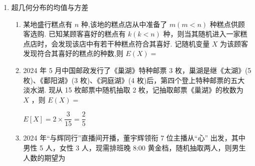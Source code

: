\begin{enumerate}
\begin{enumerate}
\begin{jieda}
            $P\left( {\xi  \leq  1}\right)  = P\left( {\xi  = 0}\right)  + P\left( {\xi  = 1}\right)  = \dfrac{{{C}}_{7}^{5}{{C}}_{5}^{6} + {{C}}_{5}^{7}{{C}}_{7}^{4}}{{{C}}_{12}^{5}}$ ,
            
            $P\left( {\xi  \geq  1}\right)  = P\left( {\xi  = 2}\right)  + P\left( {\xi  = 1}\right)  = \dfrac{{{C}}_{7}^{3}{{C}}_{5}^{2} + {{C}}_{5}^{7}{{C}}_{7}^{4}}{{{C}}_{12}^{5}},P\left( {\xi  \leq  2}\right)  = 1$
        \end{jieda}
        \item 一个班级共有 30 名学生，其中有 10 名女生， 现从中任选三人代表班级参加学校开展的某项活动,假设选出的 3 名代表中的女生人数为变量 $X$ ,男生的人数为变量 $Y$ ，则 $P\left( {X = 2}\right)  + P\left( {Y = 2}\right)$ 等于
        \begin{jieda}
            因为 $P\left( {X = 2}\right)  = \dfrac{{{C}}_{10}^{2}{{C}}_{20}^{1}}{{{C}}_{30}^{3}},P\left( {Y = 2}\right)  = \dfrac{{{C}}_{10}^{1}{{C}}_{20}^{2}}{{{C}}_{30}^{3}}$，所以 $P\left( {X = 2}\right)  + P\left( {Y = 2}\right)  = \dfrac{{{C}}_{10}^{2}{{C}}_{20}^{1} + {{C}}_{10}^{1}{{C}}_{20}^{2}}{{{C}}_{30}^{3}}$ .
        \end{jieda}
    \end{enumerate}
    \item 超几何分布的均值与方差
    \begin{enumerate}
        \item 某地盛行糕点有 $n$ 种,该地的糕点店从中准备了 $m\left( {m < n}\right)$ 种糕点供顾客选购. 已知某顾客喜好的糕点有 $k\left( {k < n}\right)$ 种，则当其随机进入一家糕点店时，会发现该店中有若干种糕点符合其喜好. 记随机变量 $X$ 为该顾客发现符合其喜好的糕点的种数,则 $E\left( X\right)  =$
        \item 2024 年 5 月中国邮政发行了《巢湖》特种邮票 3 枚，巢湖是继《太湖》(5 枚)、《鄱阳湖》(3 枚)、《洞庭湖》(4 枚)后，第四个登上特种邮票的五大淡水湖. 现从 15 枚邮票中随机抽取 2 枚，记抽取邮票《巢湖》的枚数为 $X$ ，则 $E\left( X\right)  =$
        \begin{jieda}
            $E[X] = 2 \times \dfrac{3}{15} =  \dfrac{2}{5}$
        \end{jieda}
        \item 2024 年“与辉同行”直播间开播，董宇辉领衔 7 位主播从“心” 出发，其中男性 5 人，女性 3 人，现需排班晚 8:00 黄金档，随机抽取两人，则男生人数的期望为
        

\end{enumerate}
\end{enumerate}
